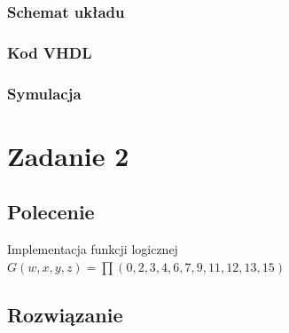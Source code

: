 \documentclass[a4paper,12pt]{extarticle}  %
\begin{document}
\subsubsection{Schemat układu}
\begin{figure}[H]
   \centering
\end{figure}

\subsubsection{Kod VHDL}
\subsubsection{Symulacja}
\section{Zadanie 2}
\subsection{Polecenie}
Implementacja funkcji logicznej \textbf{$G(w,x,y,z) = \prod(0, 2, 3, 4, 6, 7, 9, 11, 12, 13, 15)$}
\subsection{Rozwiązanie}
\end{document}
